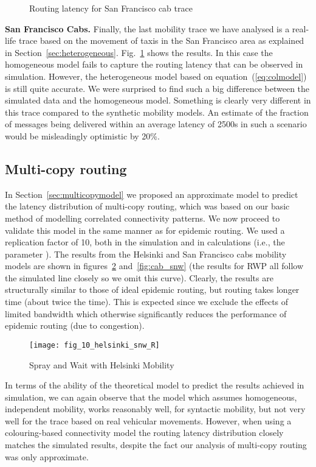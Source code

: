 \documentclass{article}
\begin{document}
\begin{figure}[htb]
  \centering
   \caption{Routing latency for San Francisco cab trace}
  \label{fig:cab}
\end{figure}


{\bf San Francisco Cabs.}
\label{sec:cab}
Finally, the last mobility trace we have analysed is a real-life trace
based on the movement of taxis in the San Francisco area as explained
in Section~\ref{sec:heterogeneous}. Fig.~\ref{fig:cab} shows the
results. In this case the homogeneous model fails to capture the
routing latency that can be observed in simulation. However, the
heterogeneous model based on equation~(\ref{eq:colmodel}) is still quite
accurate. We were surprised to find such a big difference between the
simulated data and the homogeneous model. Something is clearly very
different in this trace compared to the synthetic mobility models. An
estimate of the fraction of messages being delivered within an average
latency of 2500s in such a scenario would be misleadingly optimistic
by 20\%.

\subsection{Multi-copy routing}

In Section~\ref{sec:multicopymodel} we proposed an approximate model
to predict the latency distribution of multi-copy routing, which was
based on our basic method of modelling correlated connectivity
patterns.  We now proceed to validate this model in the same manner as
for epidemic routing. We used a replication factor of 10, both in the
simulation and in calculations (i.e., the parameter ).  The results
from the Helsinki and San Francisco cabs mobility models are shown in
figures~\ref{fig:helsinki_snw} and~\ref{fig:cab_snw} (the results for
RWP all follow the simulated line closely so we omit this
curve). Clearly, the results are structurally similar to those of
ideal epidemic routing, but routing takes longer time (about twice the
time). This is expected since we exclude the effects of limited
bandwidth which otherwise significantly reduces the performance of
epidemic routing (due to congestion).

\begin{figure}[ht]
  \centering
  \texttt{[image: fig\_10\_helsinki\_snw\_R]}
  \caption{Spray and Wait with Helsinki Mobility}
  \label{fig:helsinki_snw}
\end{figure}
In terms of the ability of the theoretical model to predict the
results achieved in simulation, we can again observe that the model
which assumes homogeneous, independent mobility, works reasonably
well, for syntactic mobility, but not very well for the trace based on
real vehicular movements. However, when using a colouring-based
connectivity model the routing latency distribution closely matches
the simulated results, despite the fact our analysis of multi-copy
routing was only approximate.
\end{document}
